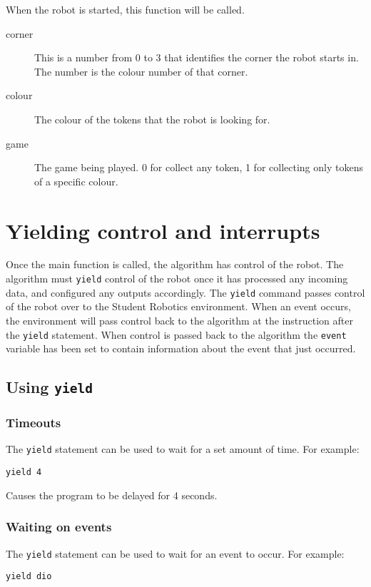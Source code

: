 \documentclass{article}
\begin{document}
When the robot is started, this function will be called.
\begin{description}
\item[corner]This is a number from 0 to 3 that identifies the corner the robot
starts in.  The number is the colour number of that corner.
\item[colour]The colour of the tokens that the robot is looking for.
\item[game]The game being played. 0 for collect any token, 1 for collecting
only tokens of a specific colour.
\end{description}
\section{Yielding control and interrupts}
Once the main function is called, the algorithm has control of the robot.  The
algorithm must \texttt{yield} control of the robot once it has
processed any incoming data, and configured any outputs accordingly.
The \texttt{yield} command passes control of the robot over to the
Student Robotics environment. When an event occurs, the environment will pass
control back to the algorithm at the instruction after the \texttt{yield}
statement.  When control is passed back to the
algorithm the \texttt{event} variable has been set to contain information
about the event that just occurred.

\subsection{Using \texttt{yield}}
\subsubsection{Timeouts}
The \texttt{yield} statement can be used to wait for a set amount of
time.  For example:

\begin{verbatim}
yield 4
\end{verbatim}

Causes the program to be delayed for 4 seconds.

\subsubsection{Waiting on events}
The \texttt{yield} statement can be used to wait for an event to
occur.  For example:

\begin{verbatim}
yield dio
\end{verbatim}
\end{document}
